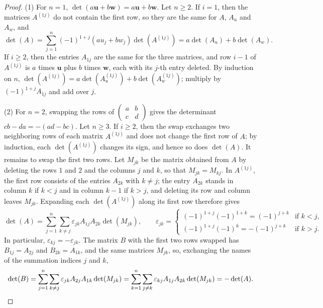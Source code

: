 \begin{proof}
    (1) For $n = 1$, $\det(a\mathbf{u} + b\mathbf{w}) = a\mathbf{u} + b\mathbf{w}$. Let $n \geq 2$. If $i = 1$, then the matrices $A^{(1j)}$ do not contain the first row, so they are the same for $A$, $A_u$ and $A_w$, and
    \[\det(A) = \sum_{j=1}^n (-1)^{1+j}(au_j + bw_j)\det(A^{(1j)}) = a\det(A_u) + b\det(A_w).\]
    If $i \geq 2$, then the entries $A_{1j}$ are the same for the three matrices, and row $i - 1$ of $A^{(1j)}$ is $a$ times $\mathbf{u}$ plus $b$ times $\mathbf{w}$, each with its $j$-th entry deleted. By induction on $n$, $\det(A^{(1j)}) = a\det(A_u^{(1j)}) + b\det(A_w^{(1j)})$; multiply by $(-1)^{1+j}A_{1j}$ and add over $j$.

    (2) For $n = 2$, swapping the rows of $\begin{pmatrix} a & b \\ c & d \end{pmatrix}$ gives the determinant $cb - da = -(ad - bc)$. Let $n \geq 3$. If $i \geq 2$, then the swap exchanges two neighboring rows of each matrix $A^{(1j)}$ and does not change the first row of $A$; by induction, each $\det(A^{(1j)})$ changes its sign, and hence so does $\det(A)$. It remains to swap the first two rows. Let $M_{jk}$ be the matrix obtained from $A$ by deleting the rows $1$ and $2$ and the columns $j$ and $k$, so that $M_{jk} = M_{kj}$. In $A^{(1j)}$, the first row consists of the entries $A_{2k}$ with $k \neq j$; the entry $A_{2k}$ stands in column $k$ if $k < j$ and in column $k - 1$ if $k > j$, and deleting its row and column leaves $M_{jk}$. Expanding each $\det(A^{(1j)})$ along its first row therefore gives
    \[\det(A) = \sum_{j=1}^n \sum_{k \neq j} \varepsilon_{jk} A_{1j}A_{2k}\det(M_{jk}), \qquad \varepsilon_{jk} = \begin{cases} (-1)^{1+j}(-1)^{1+k} = (-1)^{j+k} & \text{if } k < j, \\ (-1)^{1+j}(-1)^{k} = -(-1)^{j+k} & \text{if } k > j. \end{cases}\]
    In particular, $\varepsilon_{kj} = -\varepsilon_{jk}$. The matrix $B$ with the first two rows swapped has $B_{1j} = A_{2j}$ and $B_{2k} = A_{1k}$, and the same matrices $M_{jk}$, so, exchanging the names of the summation indices $j$ and $k$,
    \[\det(B) = \sum_{j=1}^n \sum_{k \neq j} \varepsilon_{jk} A_{2j}A_{1k}\det(M_{jk}) = \sum_{k=1}^n \sum_{j \neq k} \varepsilon_{kj} A_{1j}A_{2k}\det(M_{jk}) = -\det(A). \qedhere\]
\end{proof}


